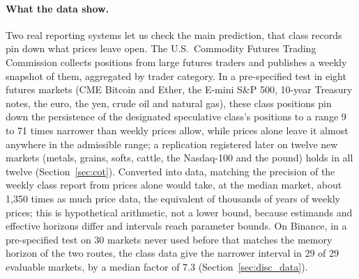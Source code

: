 \documentclass[12pt]{article}
\theoremstyle{definition}
\theoremstyle{remark}
\begin{document}
\paragraph{What the data show.} Two real reporting systems let us check the main prediction, that class records pin down what prices leave open. The U.S.\ Commodity Futures Trading Commission collects positions from large futures traders and publishes a weekly snapshot of them, aggregated by trader category. In a pre-specified test in eight futures markets (CME Bitcoin and Ether, the E-mini S\&P 500, 10-year Treasury notes, the euro, the yen, crude oil and natural gas), these class positions pin down the persistence of the designated speculative class's positions to a range 9 to 71 times narrower than weekly prices allow, while prices alone leave it almost anywhere in the admissible range; a replication registered later on twelve new markets (metals, grains, softs, cattle, the Nasdaq-100 and the pound) holds in all twelve (Section~\ref{sec:cot}). Converted into data, matching the precision of the weekly class report from prices alone would take, at the median market, about 1{,}350 times as much price data, the equivalent of thousands of years of weekly prices; this is hypothetical arithmetic, not a lower bound, because estimands and effective horizons differ and intervals reach parameter bounds. On Binance, in a pre-specified test on 30 markets never used before that matches the memory horizon of the two routes, the class data give the narrower interval in 29 of 29 evaluable markets, by a median factor of 7.3 (Section~\ref{sec:disc_data}).
\end{document}
